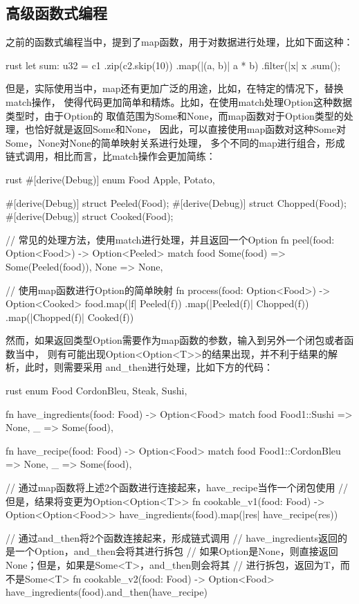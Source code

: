 \subsection{高级函数式编程}
之前的函数式编程当中，提到了map函数，用于对数据进行处理，比如下面这种：
\begin{code-block}{rust}
let sum: u32 = c1
    .zip(c2.skip(10))
    .map(|(a, b)| a * b)
    .filter(|x| x %
    .sum();
\end{code-block}

但是，实际使用当中，map还有更加广泛的用途，比如，在特定的情况下，替换match操作，
使得代码更加简单和精炼。比如，在使用match处理Option这种数据类型时，由于Option的
取值范围为Some和None，而map函数对于Option类型的处理，也恰好就是返回Some和None，
因此，可以直接使用map函数对这种Some对Some，None对None的简单映射关系进行处理，
多个不同的map进行组合，形成链式调用，相比而言，比match操作会更加简练：
\begin{code-block}{rust}
#[derive(Debug)]
enum Food {
    Apple,
    Potato,
}

#[derive(Debug)]
struct Peeled(Food);
#[derive(Debug)]
struct Chopped(Food);
#[derive(Debug)]
struct Cooked(Food);

// 常见的处理方法，使用match进行处理，并且返回一个Option
fn peel(food: Option<Food>) -> Option<Peeled> {
    match food {
        Some(food) => Some(Peeled(food)),
        None => None,
    }
}

// 使用map函数进行Option的简单映射
fn process(food: Option<Food>) -> Option<Cooked> {
    food.map(|f| Peeled(f))
        .map(|Peeled(f)| Chopped(f))
        .map(|Chopped(f)| Cooked(f))
}
\end{code-block}

然而，如果返回类型Option需要作为map函数的参数，输入到另外一个闭包或者函数当中，
则有可能出现Option<Option<T>>的结果出现，并不利于结果的解析，此时，则需要采用
and\_then进行处理，比如下方的代码：
\begin{code-block}{rust}
enum Food {
    CordonBleu,
    Steak,
    Sushi,
}

fn have_ingredients(food: Food) -> Option<Food> {
    match food {
        Food1::Sushi => None,
        _ => Some(food),
    }
}

fn have_recipe(food: Food) -> Option<Food> {
    match food {
        Food1::CordonBleu => None,
        _ => Some(food),
    }
}

// 通过map函数将上述2个函数进行连接起来，have_recipe当作一个闭包使用
// 但是，结果将变更为Option<Option<T>>
fn cookable_v1(food: Food) -> Option<Option<Food>> {
    have_ingredients(food).map(|res| have_recipe(res))
}

// 通过and_then将2个函数连接起来，形成链式调用
// have_ingredients返回的是一个Option，and_then会将其进行拆包
// 如果Option是None，则直接返回None；但是，如果是Some<T>，and_then则会将其
// 进行拆包，返回为T，而不是Some<T>
fn cookable_v2(food: Food) -> Option<Food> {
    have_ingredients(food).and_then(have_recipe)
}
\end{code-block}

